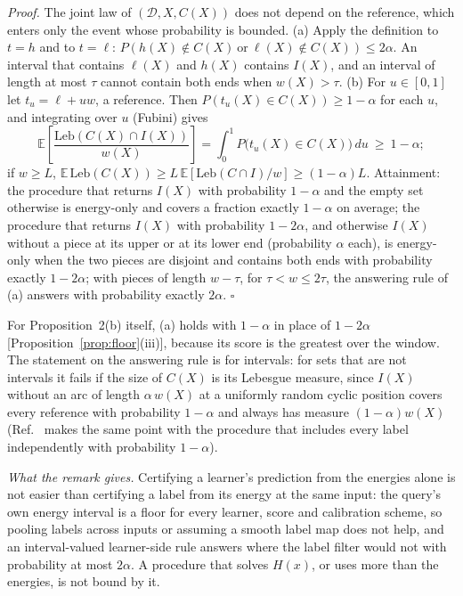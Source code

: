 \documentclass[aps,prx,onecolumn,10pt,nofootinbib,longbibliography,floatfix]{revtex4-2}
\theoremstyle{remark}
\begin{document}
\emph{Proof.} The joint law of $(\mathcal D,X,C(X))$ does not depend on the reference, which enters only the event
whose probability is bounded. (a) Apply the definition to $t=h$ and to $t=\ell$:
$P(h(X)\notin C(X)\ \text{or}\ \ell(X)\notin C(X))\le2\alpha$. An interval that contains $\ell(X)$ and $h(X)$
contains $I(X)$, and an interval of length at most $\tau$ cannot contain both ends when $w(X)>\tau$. (b) For
$u\in[0,1]$ let $t_u=\ell+uw$, a reference. Then $P(t_u(X)\in C(X))\ge1-\alpha$ for each $u$, and integrating
over $u$ (Fubini) gives
\[
\mathbb E\!\left[\frac{\mathrm{Leb}(C(X)\cap I(X))}{w(X)}\right]=\int_0^1P\big(t_u(X)\in C(X)\big)\,du\ \ge\ 1-\alpha ; %
\]
if $w\ge L$, $\mathbb E\,\mathrm{Leb}(C(X))\ge L\,\mathbb E[\mathrm{Leb}(C\cap I)/w]\ge(1-\alpha)L$.
Attainment: the procedure that returns $I(X)$ with probability $1-\alpha$ and the empty set otherwise is
energy-only and covers a fraction exactly $1-\alpha$ on average; the procedure that returns $I(X)$ with
probability $1-2\alpha$, and otherwise $I(X)$ without a piece at its upper or at its lower end (probability
$\alpha$ each), is energy-only when the two pieces are disjoint and contains both ends with probability exactly
$1-2\alpha$; with pieces of length $w-\tau$, for $\tau<w\le2\tau$, the answering rule of (a) answers with
probability exactly $2\alpha$. $\square$

For Proposition~2(b) itself, (a) holds with $1-\alpha$ in place of $1-2\alpha$ [Proposition~\ref{prop:floor}(iii)], %
because its score is the greatest over the window. The statement on the answering rule is for intervals: for sets
that are not intervals it fails if the size of $C(X)$ is its Lebesgue measure, since $I(X)$ without an arc of
length $\alpha\,w(X)$ at a uniformly random cyclic position covers every reference with probability $1-\alpha$ and
always has measure $(1-\alpha)w(X)$ (Ref.~\cite{cauchois2022} makes the same point with the procedure that
includes every label independently with probability $1-\alpha$).

\emph{What the remark gives.} Certifying a learner's prediction from the energies alone is not easier than
certifying a label from its energy at the same input: the query's own energy interval is a floor for every
learner, score and calibration scheme, so pooling labels across inputs or assuming a smooth label map does not
help, and an interval-valued learner-side rule answers where the label filter would not with probability at most
$2\alpha$. A procedure that solves $H(x)$, or uses more than the energies, is not bound by it.
\end{document}
